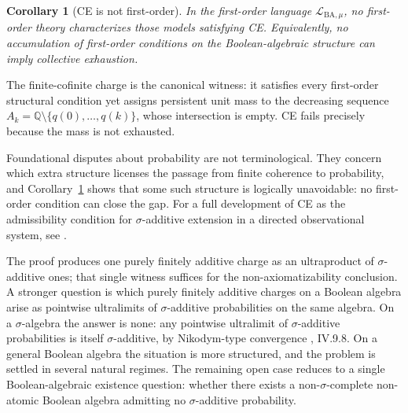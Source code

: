 \documentclass[11pt]{article}
\newtheorem{corollary}[proposition]{Corollary}
\theoremstyle{definition}
\newcommand{\Lmu}{\mathcal{L}_{\mathrm{BA},\mu}}
\newcommand{\Q}{\mathbb{Q}}
\begin{document}
\begin{corollary}[CE is not first-order]
\label{cor:ce-not-fo}
In the first-order language $\Lmu$, no first-order theory characterizes those models
satisfying CE.  Equivalently, no accumulation of first-order conditions on the
Boolean-algebraic structure can imply collective exhaustion.
\end{corollary}

\noindent
The finite-cofinite charge is the canonical witness: it satisfies every first-order
structural condition yet assigns persistent unit mass to the decreasing sequence
$A_k = \Q \setminus \{q(0), \ldots, q(k)\}$, whose intersection is empty.  CE fails
precisely because the mass is not exhausted.

Foundational disputes about probability are not terminological.  They concern which
extra structure licenses the passage from finite coherence to probability, and
Corollary~\ref{cor:ce-not-fo} shows that some such structure is logically unavoidable:
no first-order condition can close the gap.  For a full development of CE as the
admissibility condition for $\sigma$-additive extension in a directed observational
system, see \cite{mahon2025}.

\medskip

The proof produces one purely finitely additive charge as an ultraproduct of
$\sigma$-additive ones; that single witness suffices for the non-axiomatizability
conclusion.  A stronger question is which purely finitely additive charges on a
Boolean algebra arise as pointwise ultralimits of $\sigma$-additive probabilities
on the same algebra.  On a $\sigma$-algebra the answer is none: any pointwise
ultralimit of $\sigma$-additive probabilities is itself $\sigma$-additive, by
Nikodym-type convergence \cite{DunfordSchwartz1958}, IV.9.8.  On a general Boolean
algebra the situation is more structured, and the problem is settled in several
natural regimes.  The remaining open case reduces to a single Boolean-algebraic
existence question: whether there exists a non-$\sigma$-complete non-atomic Boolean
algebra admitting no $\sigma$-additive probability.



\end{document}
